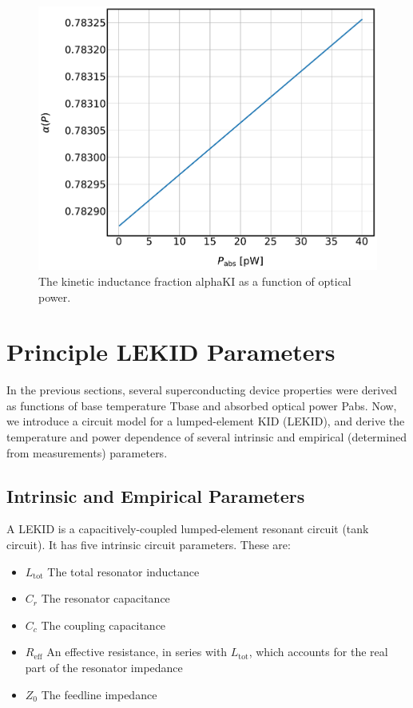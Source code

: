 \begin{figure}[!htbp]
\centering
\includegraphics[width=\textwidth]{figures/kid_model/alpha_P}
\caption[ as a function of absorbed power.]{The kinetic inductance fraction \gls{alphaKI} as a function of optical power.}
\label{fig:alpha_P}
\end{figure}

\section{Principle LEKID Parameters}\label{sec:kid_params}

In the previous sections, several superconducting device properties were derived as functions of base temperature \gls{Tbase} and absorbed optical power \gls{Pabs}. Now, we introduce a circuit model for a lumped-element KID (LEKID), and derive the temperature and power dependence of several intrinsic and empirical (determined from measurements) parameters.

\subsection{Intrinsic and Empirical Parameters}

A LEKID is a capacitively-coupled lumped-element resonant circuit (tank circuit). It has five intrinsic circuit parameters. These are:

\begin{itemize}[label={},nosep]
  \item $L_{\mathrm{tot}}$ \quad The total resonator inductance
  \item $C_{r}$ \quad The resonator capacitance
  \item $C_{c}$ \quad The coupling capacitance
  \item $R_{\mathrm{eff}}$ \quad An effective resistance, in series with $L_{\mathrm{tot}}$, which accounts for the real part of the resonator impedance
  \item $Z_{0}$ \quad The feedline impedance
\end{itemize}

